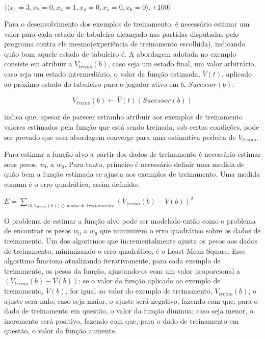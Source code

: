 $\langle \langle x_1 = 3, x_2 = 0, x_3 = 1, x_4 = 0, x_5 = 0, x_6 = 0 \rangle, +100\rangle$

Para o desenvolvimento dos exemplos de treinamento, é necessário estimar um valor para cada estado de tabuleiro alcançado nas partidas disputadas pelo programa contra ele mesmo(experiência de treinamento escolhida), indicando quão bom aquele estado de tabuleiro é. A abordagem adotada no exemplo consiste em atribuir a $V_{treino}(b)$, caso seja um estado final, um valor arbitrário, caso seja um estado intermediário, o valor da função estimada, $\overset{-}{V}(t)$, aplicado ao próximo estado do tabuleiro para o jogador ativo em $b$, $Sucessor(b)$:

\begin{equation}
V_{treino}(b) \leftarrow \overset{-}{V}(t)(Sucessor(b))
\label{eq:critico}
\end{equation}

\cite{Tom_mitchell} indica que, apesar de parecer estranho atribuir aos exemplos de treinamento valores estimados pela função que está sendo treinada, sob certas condições, pode ser provado que essa abordagem converge para uma estimativa perfeita de $V_{treino}$.

Para estimar a função alvo a partir dos dados de treinamento é necessário estimar seus pesos, $w_0$ a $w_6$. Para tanto, primeiro é necessário definir uma medida de quão bem a função estimada se ajusta aos exemplos de treinamento. Uma medida comum é o erro quadrático, assim definido:

$E = \sum\limits_{\langle b, V_{treino}(b) \rangle \in \ dados\ de\ treinamento} {(V_{treino}(b) - V(b))}^2$

O problema de estimar a função alvo pode ser modelado então como o problema de encontrar os pesos $w_0$ a $w_6$ que minimizem o erro quadrático sobre os dados de treinamento. Um dos algoritmos que incrementalmente ajusta os pesos aos dados de treinamento, minimizando o erro quadrático, é o Least Mean Square. Esse algoritmo funciona atualizando iterativamente, para cada exemplo de treinamento, os pesos da função, ajustando-os com um valor proporcional a $(V_{treino}(b) - V(b))$: se o valor da função aplicado ao exemplo de treinamento, $V(b)$, for igual ao valor do exemplo de treinamento, $V_{treino}(b)$, o ajuste será nulo; caso seja maior, o ajuste será negativo, fazendo com que, para o dado de treinamento em questão, o valor da função diminua; caso seja menor, o incremento será positivo, fazendo com que, para o dado de treinamento em questão, o valor da função aumente.

